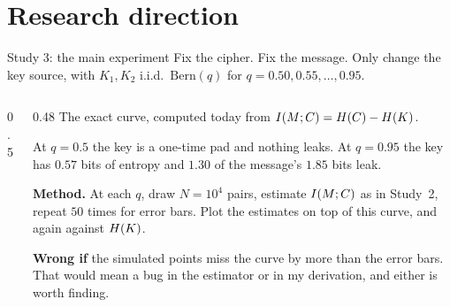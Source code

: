 \documentclass[10pt,aspectratio=169]{beamer}
\newcommand{\Bern}{\mathrm{Bern}}
\begin{document}
\section[Plan]{Research direction}

\begin{frame}{Study 3: the main experiment}
  Fix the cipher. Fix the message. Only change the key source, with
  $K_1, K_2$ i.i.d.\ $\Bern(q)$ for $q = 0.50, 0.55, \dots, 0.95$.
  \begin{columns}[T]
    \begin{column}{0.5\textwidth}
    \end{column}
    \begin{column}{0.48\textwidth}
      \small
      The exact curve, computed today from
      $I\!\left(M ; C\right) = H\!\left(C\right) - H\!\left(K\right)$.
      \medskip

      At $q = 0.5$ the key is a one-time pad and nothing leaks. At
      $q = 0.95$ the key has $0.57$ bits of entropy and $1.30$ of the
      message's $1.85$ bits leak.
      \medskip

      \textbf{Method.} At each $q$, draw $N = 10^4$ pairs, estimate
      $I\!\left(M ; C\right)$ as in Study~2, repeat $50$ times for error
      bars. Plot the estimates on top of this curve, and again against
      $H\!\left(K\right)$.
      \medskip

      \textbf{Wrong if} the simulated points miss the curve by more than
      the error bars. That would mean a bug in the estimator or in my
      derivation, and either is worth finding.
    \end{column}
  \end{columns}
\end{frame}
\end{document}
